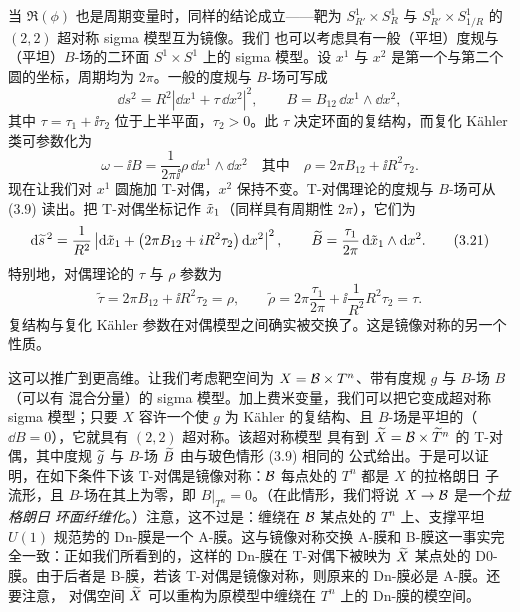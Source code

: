 当 $\Re(\phi)$ 也是周期变量时，同样的结论成立——靶为 $S^1_{R'}\times S^1_R$ 与
$S^1_{R'}\times S^1_{1/R}$ 的 $(2,2)$ 超对称 sigma 模型互为镜像。我们
也可以考虑具有一般（平坦）度规与（平坦）$B$-场的二环面 $S^1\times S^1$ 上的 sigma 模型。设 $x^1$ 与
$x^2$ 是第一个与第二个圆的坐标，周期均为 $2\pi$。一般的度规与 $B$-场可写成
\begin{equation}
  \dd s^2=R^2\left|\dd x^1+\tau\,\dd x^2\right|^2,\qquad
  B=B_{12}\,\dd x^1\wedge\dd x^2, \tag{3.19}
\end{equation}
其中 $\tau=\tau_1+\ii\tau_2$ 位于上半平面，$\tau_2>0$。此 $\tau$ 决定环面的复结构，而复化 Kähler
类可参数化为
\begin{equation}
  \omega-\ii B=\frac{1}{2\pi\ii}\rho\,\dd x^1\wedge\dd x^2
  \quad\text{其中}\quad\rho=2\pi B_{12}+\ii R^2\tau_2. \tag{3.20}
\end{equation}
现在让我们对 $x^1$ 圆施加 T-对偶，$x^2$ 保持不变。T-对偶理论的度规与 $B$-场可从 (3.9) 读出。把
T-对偶坐标记作 $\tilde x_1$（同样具有周期性 $2\pi$），它们为
\begin{equation}
  \mathrm{d}\widetilde{s}^{\,2}=\frac{1}{R^2}\left|\mathrm{d}\tilde x_1+\left(2\pi B_{12}+i R^2\tau_2\right)\mathrm{d} x^2\right|^2,
  \qquad
  \widetilde{B}=\frac{\tau_1}{2\pi}\,\mathrm{d}\tilde x_1\wedge\mathrm{d} x^2. \tag{3.21}
\end{equation}
特别地，对偶理论的 $\tau$ 与 $\rho$ 参数为
\begin{equation}
  \tilde\tau=2\pi B_{12}+\ii R^2\tau_2=\rho,\qquad
  \tilde\rho=2\pi\frac{\tau_1}{2\pi}+\ii\frac{1}{R^2}R^2\tau_2=\tau. \tag{3.22}
\end{equation}
复结构与复化 Kähler 参数在对偶模型之间确实被交换了。这是镜像对称的另一个性质。

这可以推广到更高维。让我们考虑靶空间为 $X=\mathcal{B}\times T^n$、带有度规 $g$ 与 $B$-场 $B$（可以有
混合分量）的 sigma 模型。加上费米变量，我们可以把它变成超对称 sigma 模型；只要 $X$ 容许一个使
$g$ 为 Kähler 的复结构、且 $B$-场是平坦的（$\dd B=0$），它就具有 $(2,2)$ 超对称。该超对称模型
具有到 $\widetilde{X}=\mathcal{B}\times\widetilde{T}^n$ 的 T-对偶，其中度规 $\widetilde{g}$ 与 $B$-场 $\widetilde{B}$ 由与玻色情形 (3.9) 相同的
公式给出。于是可以证明，在如下条件下该 T-对偶是镜像对称：$\mathcal{B}$ 每点处的 $T^n$ 都是 $X$ 的拉格朗日
子流形，且 $B$-场在其上为零，即 $B|_{T^n}=0$。（在此情形，我们将说 $X\to\mathcal{B}$ 是一个\emph{拉格朗日
环面纤维化}。）注意，这不过是：缠绕在 $\mathcal{B}$ 某点处的 $T^n$ 上、支撑平坦 $U(1)$ 规范势的 Dn-膜是一个
A-膜。这与镜像对称交换 A-膜和 B-膜这一事实完全一致：正如我们所看到的，这样的 Dn-膜在 T-对偶下被映为
$\widetilde{X}$ 某点处的 D0-膜。由于后者是 B-膜，若该 T-对偶是镜像对称，则原来的 Dn-膜必是 A-膜。还要注意，
对偶空间 $\widetilde{X}$ 可以重构为原模型中缠绕在 $T^n$ 上的 Dn-膜的模空间。

